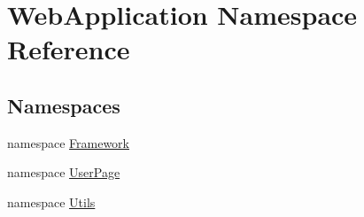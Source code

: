 \hypertarget{namespaceWebApplication}{}\section{Web\+Application Namespace Reference}
\label{namespaceWebApplication}
\subsection*{Namespaces}
\begin{DoxyCompactItemize}
\item 
namespace \mbox{\hyperlink{namespaceWebApplication_1_1Framework}{Framework}}
\item 
namespace \mbox{\hyperlink{namespaceWebApplication_1_1UserPage}{User\+Page}}
\item 
namespace \mbox{\hyperlink{namespaceWebApplication_1_1Utils}{Utils}}
\end{DoxyCompactItemize}
